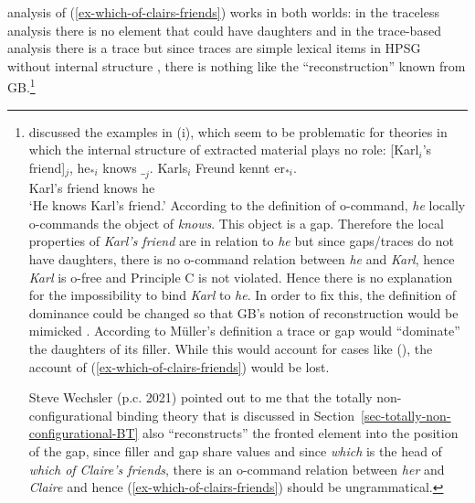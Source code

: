 \documentclass[output=paper,biblatex,babelshorthands,newtxmath,draftmode,colorlinks,citecolor=brown]{langscibook}
\begin{document}
 analysis of (\ref{ex-which-of-clairs-friends}) works in both worlds: in the
traceless analysis there is no element that could have daughters and in the trace-based analysis
there is a trace but since traces are simple lexical items in HPSG without internal structure \citep[164]{ps2}, there
is nothing like the ``reconstruction'' known from GB.\footnote{
\citet[Section~20.2]{Mueller99a} discussed the examples in (i), which seem to be problematic for
theories in which the internal structure of extracted material plays no role:
\eal
\ex {}[Karl$_i$'s friend]$_j$, he$_{*i}$ knows $\__j$.
\ex 
\gll Karls$_i$ Freund kennt er$_{*i}$.\\
     Karl's    friend knows he\\
\glt `He knows Karl's friend.'
\zl
According to the definition of o-command, \emph{he} locally o-commands the object of
\emph{knows}. This object is a gap. Therefore the local properties of \emph{Karl's
  friend} are in relation to \emph{he} but since gaps/traces do not have daughters, there is no o-command
relation between \emph{he} and \emph{Karl}, hence \emph{Karl} is o-free and Principle C is not
violated. Hence there is no explanation for the impossibility to bind \emph{Karl} to \emph{he}. In
order to fix this, the definition of dominance could be changed so that GB's notion of
reconstruction would be mimicked \citep[--410]{Mueller99a}. According to Müller's definition a trace or gap
would ``dominate'' the daughters of its filler. While this would account for cases like (),
the account of (\ref{ex-which-of-clairs-friends}) would be lost.

Steve Wechsler (p.c. 2021) pointed out to me that the totally non-configurational binding theory
that is discussed in Section~\ref{sec-totally-non-configurational-BT} also ``reconstructs'' the
fronted element into the position of the gap, since filler and gap share \local values and since
\emph{which} is the head of \emph{which of Claire's friends}, there is an o-command relation between
\emph{her} and \emph{Claire} and hence (\ref{ex-which-of-clairs-friends}) should be ungrammatical.

}
\end{document}
